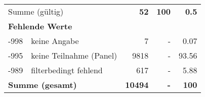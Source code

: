 \begin{longtable}{lXrrr}
     \midrule
     \multicolumn{2}{l}{Summe (gültig)} &
       \textbf{\num{52}} &
     \textbf{\num{100}} &
       \textbf{\num[round-mode=places,round-precision=2]{0.5}} \\
     \multicolumn{5}{l}{\textbf{Fehlende Werte}}\\
       -998 &
       keine Angabe &
         \num{7} &
        - &
         \num[round-mode=places,round-precision=2]{0.07} \\
       -995 &
       keine Teilnahme (Panel) &
         \num{9818} &
        - &
         \num[round-mode=places,round-precision=2]{93.56} \\
       -989 &
       filterbedingt fehlend &
         \num{617} &
        - &
         \num[round-mode=places,round-precision=2]{5.88} \\
     \midrule
     \multicolumn{2}{l}{\textbf{Summe (gesamt)}} &
          \textbf{\num{10494}} &
        \textbf{-} &
        \textbf{\num{100}} \\
     \bottomrule
     \end{longtable}
     
